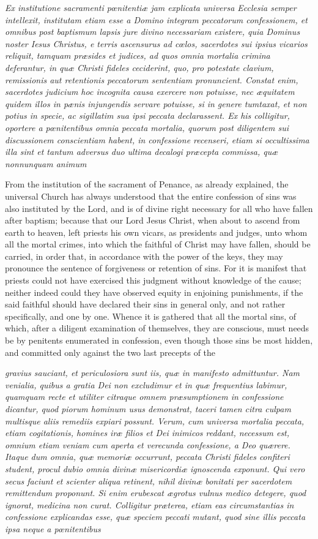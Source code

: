 \emph{Ex institutione sacramenti pœnitentiæ jam explicata universa Ecclesia semper intellexit, institutam etiam esse a Domino integram peccatorum confessionem, et omnibus post baptismum lapsis jure divino necessariam existere, quia Dominus noster Iesus Christus, e terris ascensurus ad cœlos, sacerdotes sui ipsius vicarios reliquit, tamquam præsides et judices, ad quos omnia mortalia crimina deferantur, in quæ Christi fideles ceciderint, quo, pro potestate clavium, remissionis aut retentionis peccatorum sententiam pronuncient. Constat enim, sacerdotes judicium hoc incognita causa exercere non potuisse, nec æquitatem quidem illos in pænis injungendis servare potuisse, si in genere tumtaxat, et non potius in specie, ac sigillatim sua ipsi peccata declarassent. Ex his colligitur, oportere a pœnitentibus omnia peccata mortalia, quorum post diligentem sui discussionem conscientiam habent, in confessione recenseri, etiam si occultissima illa sint et tantum adversus duo ultima decalogi præcepta commissa, quæ nonnunquam animum }

From the institution of the sacrament of Penance, as already explained, the universal Church has always understood that the entire confession of sins was also instituted by the Lord, and is of divine right necessary for all who have fallen after baptism; because that our Lord Jesus Christ, when about to ascend from earth to heaven, left priests his own vicars, as presidents and judges, unto whom all the mortal crimes, into which the faithful of Christ may have fallen, should be carried, in order that, in accordance with the power of the keys, they may pronounce the sentence of forgiveness or retention of sins. For it is manifest that priests could not have exercised this judgment without knowledge of the cause; neither indeed could they have observed equity in enjoining punishments, if the said faithful should have declared their sins in general only, and not rather specifically, and one by one. Whence it is gathered that all the mortal sins, of which, after a diligent examination of themselves, they are conscious, must needs be by penitents enumerated in confession, even though those sins be most hidden, and committed only against the two last precepts of the

\emph{gravius sauciant, et periculosiora sunt iis, quæ in manifesto admittuntur. Nam venialia, quibus a gratia Dei non excludimur et in quæ frequentius labimur, quamquam recte et utiliter citraque omnem præsumptionem in confessione dicantur, quod piorum hominum usus demonstrat, taceri tamen citra culpam multisque aliis remediis expiari possunt. Verum, cum universa mortalia peccata, etiam cogitationis, homines iræ filios et Dei inimicos reddant, necessum est, omnium etiam veniam cum aperta et verecunda confessione, a Deo quærere. Itaque dum omnia, quæ memoriæ occurrunt, peccata Christi fideles confiteri student, procul dubio omnia divinæ misericordiæ ignoscenda exponunt. Qui vero secus faciunt et scienter aliqua retinent, nihil divinæ bonitati per sacerdotem remittendum proponunt. Si enim erubescat ægrotus vulnus medico detegere, quod ignorat, medicina non curat. Colligitur præterea, etiam eas circumstantias in confessione explicandas esse, quæ speciem peccati mutant, quod sine illis peccata ipsa neque a pœnitentibus }

